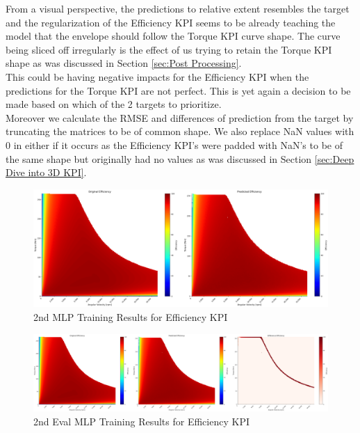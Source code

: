 \documentclass{report} %
\begin{document}
From a visual perspective, the predictions to relative extent resembles the target and the regularization of the Efficiency \ac{KPI} seems to be already teaching the model that the envelope should follow the Torque \ac{KPI} curve shape.  
The curve being sliced off irregularly is the effect of us trying to retain the Torque \ac{KPI} shape as was discussed in Section \ref{sec:Post Processing}.\\
This could be having negative impacts for the Efficiency \ac{KPI}  when the predictions for the Torque \ac{KPI} are not perfect.
This is yet again a decision to be made based on which of the 2 targets to prioritize. \\

Moreover we calculate the RMSE and differences of prediction from the target by truncating the matrices to be of common shape.
We also replace \ac{NaN} values with 0 in either if it occurs as the Efficiency \ac{KPI}'s were padded with \ac{NaN}'s to be of the same shape but originally had no values as was discussed in Section \ref{sec:Deep Dive into 3D KPI}.\\

\begin{figure}[H]
    \centering
    \includegraphics[width=1\textwidth]{./ReportImages/KPI3Dprediction2.png} 
    \caption{2nd MLP Training Results for Efficiency \ac{KPI}} 
    \label{fig:2nd MLP Training Results for 3D KPI(Efficiency)}
\end{figure}


\begin{figure}[H]
    \centering
    \includegraphics[width=1\textwidth]{./ReportImages/evalKPI3Dprediction2.png} 
    \caption{2nd Eval MLP Training Results for Efficiency \ac{KPI}} 
    \label{fig:2nd Eval MLP Training for 3D KPI(Efficiency)}
\end{figure}
\end{document}
